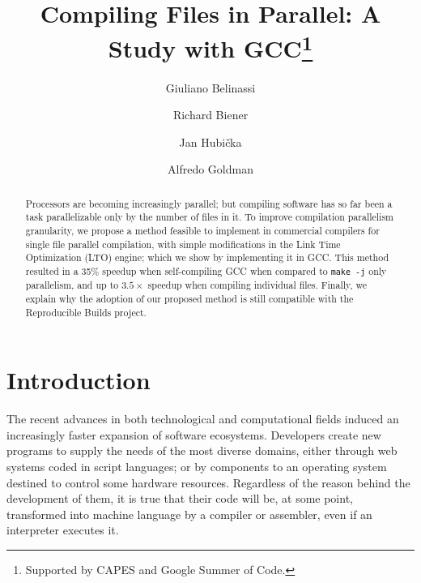 \documentclass[runningheads]{llncs}
\begin{document}


%
\title{Compiling Files in Parallel: A Study with GCC\thanks{Supported by CAPES and Google Summer of Code.}}
%
%
\author{Giuliano Belinassi \and Richard Biener \and Jan Hubi\v cka  \and Alfredo Goldman}
%
%

%
\maketitle              %
%
\begin{abstract}

Processors are becoming increasingly parallel; but compiling software has so
far been a task parallelizable only by the number of files in it. To improve
compilation parallelism granularity, we propose a method feasible to implement
in commercial compilers for single file parallel compilation, with simple
modifications in the Link Time Optimization (LTO) engine; which we show by
implementing it in GCC. This method resulted in a 35\% speedup when
self-compiling GCC when compared to \texttt{make -j} only parallelism, and
up to $3.5\times$ speedup when compiling individual files. 
Finally, we explain why the adoption of our proposed method is still compatible
with the Reproducible Builds project.

\end{abstract}
%
%
%
\section{Introduction}

The recent advances in both technological and computational fields induced an
increasingly faster expansion of software ecosystems. Developers create new
programs to supply the needs of the most diverse domains, either through web
systems coded in script languages; or by components to an operating system
destined to control some hardware resources. Regardless of the reason behind
the development of them, it is true that their code will be, at some
point, transformed into machine language by a compiler or assembler, even if an
interpreter executes it.
\end{document}
